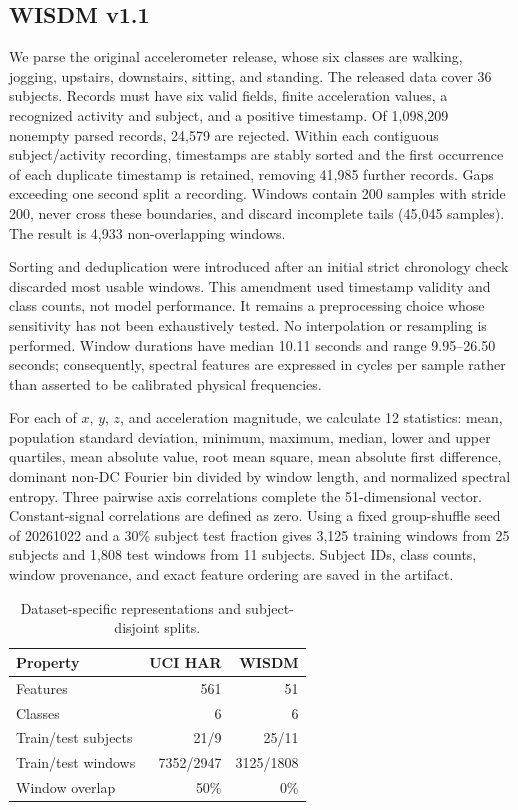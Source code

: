 \documentclass[conference]{IEEEtran}
\begin{document}
\subsection{WISDM v1.1}
We parse the original accelerometer release, whose six classes are walking, jogging, upstairs, downstairs, sitting, and standing. The released data cover 36 subjects. Records must have six valid fields, finite acceleration values, a recognized activity and subject, and a positive timestamp. Of 1,098,209 nonempty parsed records, 24,579 are rejected. Within each contiguous subject/activity recording, timestamps are stably sorted and the first occurrence of each duplicate timestamp is retained, removing 41,985 further records. Gaps exceeding one second split a recording. Windows contain 200 samples with stride 200, never cross these boundaries, and discard incomplete tails (45,045 samples). The result is 4,933 non-overlapping windows.

Sorting and deduplication were introduced after an initial strict chronology check discarded most usable windows. This amendment used timestamp validity and class counts, not model performance. It remains a preprocessing choice whose sensitivity has not been exhaustively tested. No interpolation or resampling is performed. Window durations have median 10.11 seconds and range 9.95--26.50 seconds; consequently, spectral features are expressed in cycles per sample rather than asserted to be calibrated physical frequencies.

For each of $x$, $y$, $z$, and acceleration magnitude, we calculate 12 statistics: mean, population standard deviation, minimum, maximum, median, lower and upper quartiles, mean absolute value, root mean square, mean absolute first difference, dominant non-DC Fourier bin divided by window length, and normalized spectral entropy. Three pairwise axis correlations complete the 51-dimensional vector. Constant-signal correlations are defined as zero. Using a fixed group-shuffle seed of 20261022 and a 30\% subject test fraction gives 3,125 training windows from 25 subjects and 1,808 test windows from 11 subjects. Subject IDs, class counts, window provenance, and exact feature ordering are saved in the artifact.

\begin{table}[t]
\caption{Dataset-specific representations and subject-disjoint splits.}
\label{tab:data}\centering\small
\begin{tabular}{lrr}\toprule
Property & UCI HAR & WISDM \\\midrule
Features & 561 & 51 \\
Classes & 6 & 6 \\
Train/test subjects & 21/9 & 25/11 \\
Train/test windows & 7352/2947 & 3125/1808 \\
Window overlap & 50\% & 0\% \\\bottomrule
\end{tabular}
\end{table}
\end{document}
